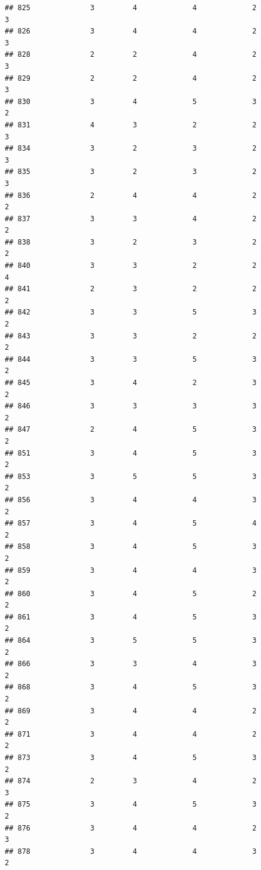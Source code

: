 \documentclass[
]{article}
\begin{document}
\begin{verbatim}
## 825              3         4             4             2           3
## 826              3         4             4             2           3
## 828              2         2             4             2           3
## 829              2         2             4             2           3
## 830              3         4             5             3           2
## 831              4         3             2             2           3
## 834              3         2             3             2           3
## 835              3         2             3             2           3
## 836              2         4             4             2           2
## 837              3         3             4             2           2
## 838              3         2             3             2           2
## 840              3         3             2             2           4
## 841              2         3             2             2           2
## 842              3         3             5             3           2
## 843              3         3             2             2           2
## 844              3         3             5             3           2
## 845              3         4             2             3           2
## 846              3         3             3             3           2
## 847              2         4             5             3           2
## 851              3         4             5             3           2
## 853              3         5             5             3           2
## 856              3         4             4             3           2
## 857              3         4             5             4           2
## 858              3         4             5             3           2
## 859              3         4             4             3           2
## 860              3         4             5             2           2
## 861              3         4             5             3           2
## 864              3         5             5             3           2
## 866              3         3             4             3           2
## 868              3         4             5             3           2
## 869              3         4             4             2           2
## 871              3         4             4             2           2
## 873              3         4             5             3           2
## 874              2         3             4             2           3
## 875              3         4             5             3           2
## 876              3         4             4             2           3
## 878              3         4             4             3           2

\end{verbatim}
\end{document}
